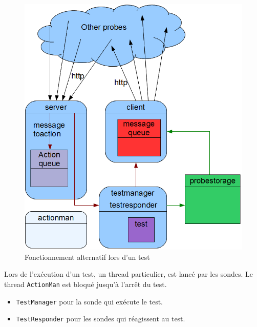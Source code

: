 \documentclass[a4paper,11pt]{article}
\newcommand{\cd}[1]{\texttt{#1}}
\begin{document}
\begin{figure}
\centering\includegraphics[width=\linewidth]{img/graphTest.png}
\caption{Fonctionnement alternatif lors d'un test}
\end{figure}

Lors de l'exécution d'un test, un thread particulier, est lancé par les sondes. Le thread \cd{ActionMan} est bloqué jusqu'à l'arrêt du test.
\begin{itemize}
\item \cd{TestManager} pour la sonde qui exécute le test.
\item \cd{TestResponder} pour les sondes qui réagissent au test.
\end{itemize}



\newpage
\end{document}
